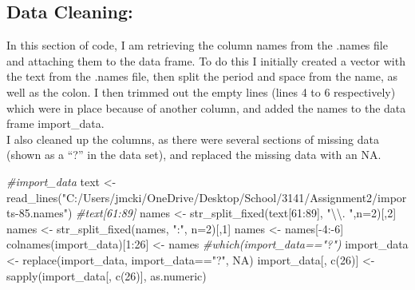 \documentclass[
]{article}
\newenvironment{Shaded}{\begin{snugshade}}{\end{snugshade}}
\newcommand{\AttributeTok}[1]{\textcolor[rgb]{0.77,0.63,0.00}{#1}}
\newcommand{\CommentTok}[1]{\textcolor[rgb]{0.56,0.35,0.01}{\textit{#1}}}
\newcommand{\ConstantTok}[1]{\textcolor[rgb]{0.00,0.00,0.00}{#1}}
\newcommand{\DecValTok}[1]{\textcolor[rgb]{0.00,0.00,0.81}{#1}}
\newcommand{\FunctionTok}[1]{\textcolor[rgb]{0.00,0.00,0.00}{#1}}
\newcommand{\NormalTok}[1]{#1}
\newcommand{\OtherTok}[1]{\textcolor[rgb]{0.56,0.35,0.01}{#1}}
\newcommand{\SpecialCharTok}[1]{\textcolor[rgb]{0.00,0.00,0.00}{#1}}
\newcommand{\StringTok}[1]{\textcolor[rgb]{0.31,0.60,0.02}{#1}}
\begin{document}
\hypertarget{data-cleaning}{%
\subsection{Data Cleaning:}\label{data-cleaning}}

In this section of code, I am retrieving the column names from the
.names file and attaching them to the data frame. To do this I initially
created a vector with the text from the .names file, then split the
period and space from the name, as well as the colon. I then trimmed out
the empty lines (lines 4 to 6 respectively) which were in place because
of another column, and added the names to the data frame import\_data.\\
I also cleaned up the columns, as there were several sections of missing
data (shown as a ``?'' in the data set), and replaced the missing data
with an NA.

\begin{Shaded}
\begin{Highlighting}[]
\CommentTok{\#import\_data}
\NormalTok{text }\OtherTok{\textless{}{-}} \FunctionTok{read\_lines}\NormalTok{(}\StringTok{"C:/Users/jmcki/OneDrive/Desktop/School/3141/Assignment2/imports{-}85.names"}\NormalTok{)}
\CommentTok{\#text[61:89]}
\NormalTok{names }\OtherTok{\textless{}{-}} \FunctionTok{str\_split\_fixed}\NormalTok{(text[}\DecValTok{61}\SpecialCharTok{:}\DecValTok{89}\NormalTok{], }\StringTok{"}\SpecialCharTok{\textbackslash{}\textbackslash{}}\StringTok{. "}\NormalTok{,}\AttributeTok{n=}\DecValTok{2}\NormalTok{)[,}\DecValTok{2}\NormalTok{]}
\NormalTok{names }\OtherTok{\textless{}{-}} \FunctionTok{str\_split\_fixed}\NormalTok{(names, }\StringTok{":"}\NormalTok{, }\AttributeTok{n=}\DecValTok{2}\NormalTok{)[,}\DecValTok{1}\NormalTok{]}
\NormalTok{names }\OtherTok{\textless{}{-}}\NormalTok{ names[}\SpecialCharTok{{-}}\DecValTok{4}\SpecialCharTok{:{-}}\DecValTok{6}\NormalTok{]}
\FunctionTok{colnames}\NormalTok{(import\_data)[}\DecValTok{1}\SpecialCharTok{:}\DecValTok{26}\NormalTok{] }\OtherTok{\textless{}{-}}\NormalTok{ names}
\CommentTok{\#which(import\_data=="?")}
\NormalTok{import\_data }\OtherTok{\textless{}{-}} \FunctionTok{replace}\NormalTok{(import\_data, import\_data}\SpecialCharTok{==}\StringTok{"?"}\NormalTok{, }\ConstantTok{NA}\NormalTok{)}
\NormalTok{import\_data[, }\FunctionTok{c}\NormalTok{(}\DecValTok{26}\NormalTok{)] }\OtherTok{\textless{}{-}} \FunctionTok{sapply}\NormalTok{(import\_data[, }\FunctionTok{c}\NormalTok{(}\DecValTok{26}\NormalTok{)], as.numeric)}
\end{Highlighting}
\end{Shaded}
\end{document}
